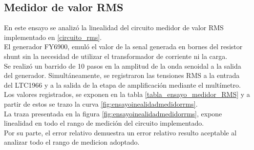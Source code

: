 \subsection{Medidor de valor RMS}\label{ensayo_medidor_rms}
En este ensayo se analiz\'{o} la linealidad del circuito medidor de valor RMS implementado en \ref{circuito_rms}.\\
El generador FY6900, emul\'{o} el valor de la senal generada en bornes del resistor shunt sin la necesidad de utilizar el transformador de corriente ni la carga.\\
Se realiz\'{o} un barrido de 10 pasos en la amplitud de la onda senoidal a la salida del generador. Simultáneamente, se registraron las tensiones RMS a la entrada del LTC1966 y a la salida de la etapa de amplificaci\'{o}n mediante el mult\'{i}metro. Los valores registrados, se exponen en la tabla \ref{tabla_ensayo_medidor_RMS} y a partir de estos se trazo la curva \ref{fig:ensayoinealidadmedidorrms}.\\
La traza presentada en la figura \ref{fig:ensayoinealidadmedidorrms}, expone linealidad en todo el rango de medici\'{o}n del circuito implementado.\\
Por su parte, el error relativo demuestra un error relativo resulto aceptable al analizar todo el rango de medicion adoptado.
